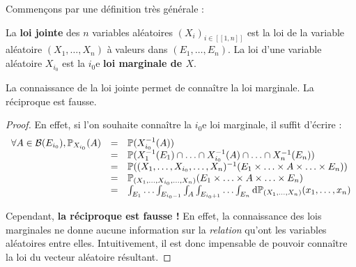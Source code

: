 \documentclass[../integ-proba.tex]{subfiles}
\begin{document}
    Commençons par une définition très générale :

    \begin{defi}
        \label{defi:loi_jointe}
        La \textbf{loi jointe} des $n$ variables aléatoires $\left( X_i \right)_{i \in [\![1, n]\!]}$ est la loi de la variable aléatoire $\left( X_1, \ldots, X_n \right)$ à valeurs dans $\left(E_1, \ldots, E_n\right)$.
        La loi d'une variable aléatoire $X_{i_0}$ est la $i_0$e \textbf{loi marginale de $X$}.
    \end{defi}

    \begin{prop}
        \label{prop:connaissance_jointe}
        La connaissance de la loi jointe permet de connaître la loi marginale.
        La réciproque est fausse.
    \end{prop}

    \begin{proof}
        En effet, si l'on souhaite connaître la $i_0$e loi marginale, il suffit d'écrire :
        \begin{displaymath}
            \begin{array}{rcl}
                \forall A \in \mathcal{B}(E_{i_0}), \mathbb{P}_{X_{i_0}}(A) & = & \mathbb{P}(X_{i_0}^{-1}(A)) \\
                                                   & = & \mathbb{P}(X_1^{-1}(E_1) \cap \ldots \cap X_{i_0}^{-1}(A) \cap \ldots \cap X_n^{-1}(E_n)) \\
                                                   & = & \mathbb{P}((X_1, \ldots, X_{i_0}, \ldots, X_n)^{-1}(E_1 \times \ldots \times A \times \ldots \times E_n)) \\
                                                   & = & \mathbb{P}_{(X_1, \ldots, X_{i_0}, \ldots, X_n)}(E_1 \times \ldots \times A \times \ldots \times E_n) \\
                                                   & = & \int_{E_1} \ldots \int_{E_{i_0 - 1}} \int_A \int_{E_{i_0 + 1}} \ldots \int_{E_n} \textnormal{d} \mathbb{P}_{\left( X_1, \ldots, X_n \right)}(x_1, \ldots, x_n)
            \end{array}
        \end{displaymath}

        Cependant, \textbf{la réciproque est fausse !}
        En effet, la connaissance des lois marginales ne donne aucune information sur la \textit{relation} qu'ont les variables aléatoires entre elles.
        Intuitivement, il est donc impensable de pouvoir connaître la loi du vecteur aléatoire résultant.
    \end{proof}
\end{document}

